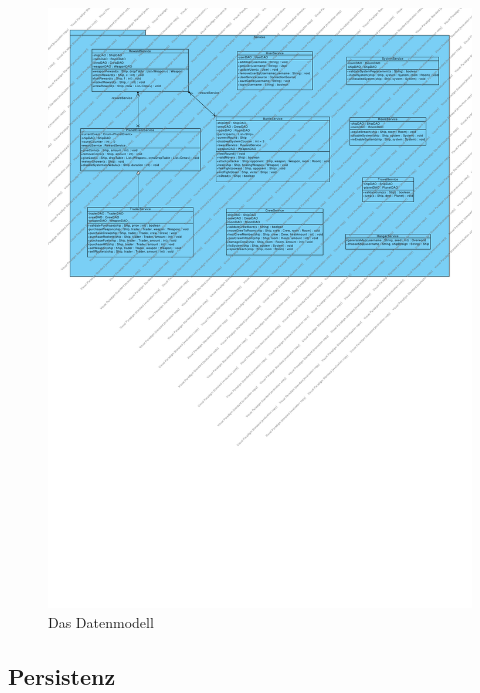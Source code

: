 \documentclass[fontsize=12pt,paper=a4,twoside]{scrartcl}
\begin{document}
\begin{figure}[H]
\begin{center}
  \includegraphics[width=\linewidth]{../GT_Modulsicht/src/Service.pdf}
    \caption{Das Datenmodell}
\end{center}
\end{figure}

\subsection{Persistenz}
\end{document}
